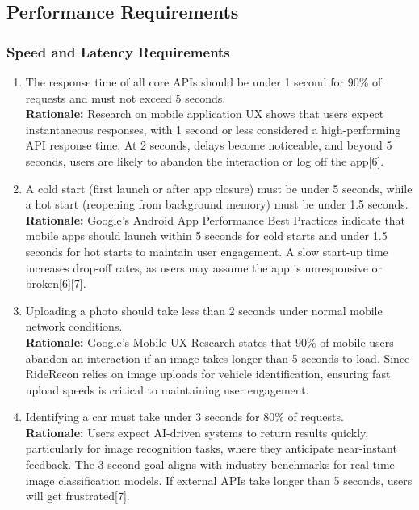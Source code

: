 \documentclass[]{article}
\begin{document}

\subsection{Performance Requirements}
\label{sub:performance_requirements}

\subsubsection{Speed and Latency Requirements}
\label{ssub:speed_and_latency_requirements}
\begin{enumerate}[label={PR-SL\arabic*.}]
    \item The response time of all core APIs should be under 1 second for 90\% of requests and must not exceed 5 seconds.\\ 
	\textbf{Rationale:} Research on mobile application UX shows that users expect instantaneous responses, with 1 second or less considered a high-performing API response time. At 2 seconds, delays become noticeable, and beyond 5 seconds, users are likely to abandon the interaction or log off the app[6].
	\item A cold start (first launch or after app closure) must be under 5 seconds, while a hot start (reopening from background memory) must be under 1.5 seconds.\\
	\textbf{Rationale:} Google’s Android App Performance Best Practices indicate that mobile apps should launch within 5 seconds for cold starts and under 1.5 seconds for hot starts to maintain user engagement. A slow start-up time increases drop-off rates, as users may assume the app is unresponsive or broken[6][7].
	\item Uploading a photo should take less than 2 seconds under normal mobile network conditions.\\
	\textbf{Rationale:} Google’s Mobile UX Research states that 90\% of mobile users abandon an interaction if an image takes longer than 5 seconds to load. Since RideRecon relies on image uploads for vehicle identification, ensuring fast upload speeds is critical to maintaining user engagement.
	\item Identifying a car must take under 3 seconds for 80\% of requests.\\
	\textbf{Rationale:} Users expect AI-driven systems to return results quickly, particularly for image recognition tasks, where they anticipate near-instant feedback. The 3-second goal aligns with industry benchmarks for real-time image classification models. If external APIs take longer than 5 seconds, users will get frustrated[7].
\end{enumerate}
\end{document}
